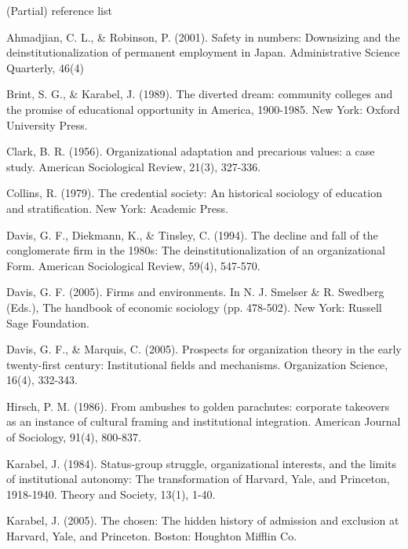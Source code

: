 \begin{frame}{(Partial) reference list}
	
	\begin{itemize}
	{\tiny
		\item Ahmadjian, C. L., \& Robinson, P. (2001). Safety in numbers: Downsizing and the deinstitutionalization of permanent employment in Japan. Administrative Science Quarterly, 46(4)%
		\item Brint, S. G., \& Karabel, J. (1989). The diverted dream: community colleges and the promise of educational opportunity in America, 1900-1985. New York: Oxford University Press.
		\item Clark, B. R. (1956). Organizational adaptation and precarious values: a case study. American Sociological Review, 21(3), 327-336.
		\item Collins, R. (1979). The credential society: An historical sociology of education and stratification. New York: Academic Press.
		\item Davis, G. F., Diekmann, K., \& Tinsley, C. (1994). The decline and fall of the conglomerate firm in the 1980s: The deinstitutionalization of an organizational Form. American Sociological Review, 59(4), 547-570. 
		\item Davis, G. F. (2005). Firms and environments. In N. J. Smelser \& R. Swedberg (Eds.), The handbook of economic sociology (pp. 478-502). New York: Russell Sage Foundation.
		\item Davis, G. F., \& Marquis, C. (2005). Prospects for organization theory in the early twenty-first century: Institutional fields and mechanisms. Organization Science, 16(4), 332-343. 
		\item Hirsch, P. M. (1986). From ambushes to golden parachutes: corporate takeovers as an instance of cultural framing and institutional integration. American Journal of Sociology, 91(4), 800-837. 
		\item Karabel, J. (1984). Status-group struggle, organizational interests, and the limits of institutional autonomy: The transformation of Harvard, Yale, and Princeton, 1918-1940. Theory and Society, 13(1), 1-40. 
		\item Karabel, J. (2005). The chosen: The hidden history of admission and exclusion at Harvard, Yale, and Princeton. Boston: Houghton Mifflin Co.
}
\end{itemize}
\end{frame}
